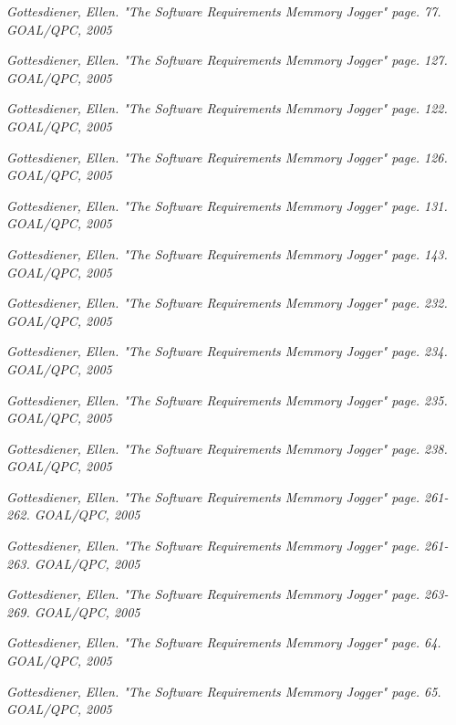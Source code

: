 \documentclass[a4paper]{article}
\begin{document}
\begin{thebibliography}{99}     
	
 \emph{Gottesdiener, Ellen. \textsl{"The Software Requirements Memmory Jogger" page. 77}. GOAL/QPC, 2005}

 \emph{Gottesdiener, Ellen. \textsl{"The Software Requirements Memmory Jogger" page. 127}. GOAL/QPC, 2005}

 \emph{Gottesdiener, Ellen. \textsl{"The Software Requirements Memmory Jogger" page. 122}. GOAL/QPC, 2005}

 \emph{Gottesdiener, Ellen. \textsl{"The Software Requirements Memmory Jogger" page. 126}. GOAL/QPC, 2005}

 \emph{Gottesdiener, Ellen. \textsl{"The Software Requirements Memmory Jogger" page. 131}. GOAL/QPC, 2005}

 \emph{Gottesdiener, Ellen. \textsl{"The Software Requirements Memmory Jogger" page. 143}. GOAL/QPC, 2005}

 \emph{Gottesdiener, Ellen. \textsl{"The Software Requirements Memmory Jogger" page. 232}. GOAL/QPC, 2005}

 \emph{Gottesdiener, Ellen. \textsl{"The Software Requirements Memmory Jogger" page. 234}. GOAL/QPC, 2005}

 \emph{Gottesdiener, Ellen. \textsl{"The Software Requirements Memmory Jogger" page. 235}. GOAL/QPC, 2005}

 \emph{Gottesdiener, Ellen. \textsl{"The Software Requirements Memmory Jogger" page. 238}. GOAL/QPC, 2005}

 \emph{Gottesdiener, Ellen. \textsl{"The Software Requirements Memmory Jogger" page. 261-262}. GOAL/QPC, 2005}

 \emph{Gottesdiener, Ellen. \textsl{"The Software Requirements Memmory Jogger" page. 261-263}. GOAL/QPC, 2005}

 \emph{Gottesdiener, Ellen. \textsl{"The Software Requirements Memmory Jogger" page. 263-269}. GOAL/QPC, 2005}

 \emph{Gottesdiener, Ellen. \textsl{"The Software Requirements Memmory Jogger" page. 64}. GOAL/QPC, 2005}

 \emph{Gottesdiener, Ellen. \textsl{"The Software Requirements Memmory Jogger" page. 65}. GOAL/QPC, 2005}


\end{thebibliography}
\end{document}
